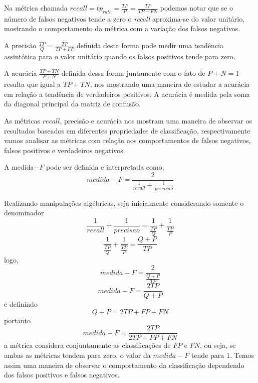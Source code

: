 Na métrica chamada $recall= tp_{rate}=\frac{TP}{P}=\frac{TP}{TP+FN}$ podemos notar que se o número de falsos negativos tende a zero o \textit{recall} aproxima-se do valor unitário, mostrando o comportamento da métrica com a variação dos falsos negativos.

A precisão $\frac{TP}{Q}=\frac{TP}{TP+FP}$ definida desta forma pode medir uma tendência assintótica para o valor unitário quando os falsos positivos  tende para zero.  

A acurácia $\frac{TP+TN}{P+N}$ definida dessa forma juntamente com o fato de $P+N=1$ resulta que igual a $TP+TN$, nos mostrando uma maneira de estudar a acurácia em relação a tendência de verdadeiros positivos. 
A acurácia é medida pela soma da diagonal principal da matriz de confusão.

As métricas $recall$, precisão e acurácia nos mostram uma maneira de observar os resultados baseados em diferentes propriedades de classificação, respectivamente vamos analisar as métricas com relação aos comportamentos de falsos negativos, falsos positivos e verdadeiros negativos.  

A medida$-F$ pode ser definida e interpretada como, 
\begin{equation}\nonumber
medida-F=\frac{2}{\frac{1}{recall}+\frac{1}{precisao}}
\end{equation}

Realizando manipulações algébricas, seja inicialmente considerando somente o denominador
\begin{equation}\nonumber
	\frac{1}{recall}+\frac{1}{precisao}=\frac{1}{\frac{TP}{Q}}+\frac{1}{\frac{TP}{P}}
\end{equation}
\begin{equation}\nonumber
	\frac{1}{\frac{TP}{Q}}+\frac{1}{\frac{TP}{P}} = \frac{Q+P}{TP}
\end{equation}
logo,
\begin{equation}\nonumber
	medida-F=\frac{2}{\frac{Q+P}{TP}}
\end{equation}
\begin{equation}\nonumber
	medida-F=\frac{2TP}{Q+P}
\end{equation}
e definindo
\begin{equation}\nonumber
     Q+P=2TP+FP+FN
\end{equation}
portanto
\begin{equation}\nonumber
	medida-F=\frac{2TP}{2TP+FP+FN}
\end{equation}
a métrica considera conjuntamente as classificações de $FP$ e $FN$, ou seja, se ambas as métricas tendem para zero, o valor da $medida-F$ tende para $1$. Temos assim uma maneira de observar o comportamento da classificação dependendo dos falsos positivos e falsos negativos.

